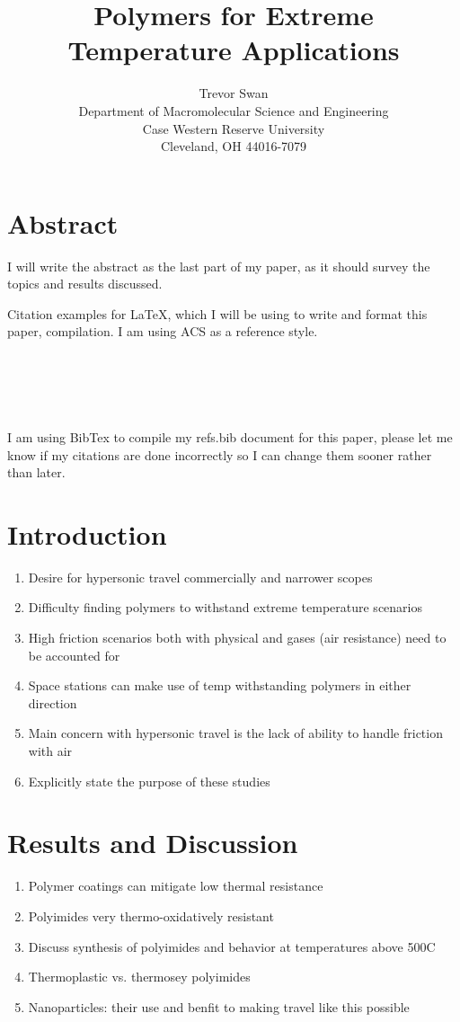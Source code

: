 \documentclass[12pt]{article}
\title{Polymers for Extreme Temperature Applications}
\author{Trevor Swan \\
Department of Macromolecular Science and Engineering \\ 
Case Western Reserve University \\
Cleveland, OH 44016-7079}
\date{}
\begin{document}
\maketitle

\section{Abstract}
	I will write the abstract as the last part of my paper, as it should survey the topics and results discussed.

\indent Citation examples for LaTeX, which I will be using to write and format this paper, compilation. I am using ACS as a reference style. \\
	\cite{Batra2020} \\
	\cite{Bashandeh2021} \\
	\cite{Dodiok2014} \\
	\cite{Rioboo2010} \\
	\cite{LiTong2022} \\
\indent I am using BibTex to compile my refs.bib document for this paper, please let me know if my citations are done incorrectly so I can change them sooner rather than later.
\section{Introduction}
	\begin{enumerate}
		\item Desire for hypersonic travel commercially and narrower scopes
		\item Difficulty finding polymers to withstand extreme temperature scenarios
		\item High friction scenarios both with physical and gases (air resistance) need to be accounted for
		\item Space stations can make use of temp withstanding polymers in either direction
		\item Main concern with hypersonic travel is the lack of ability to handle friction with air
		\item Explicitly state the purpose of these studies
	\end{enumerate}
\section{Results and Discussion}
	\begin{enumerate}
		\item Polymer coatings can mitigate low thermal resistance
		\item Polyimides very thermo-oxidatively resistant \cite{Dodiok2014}
		\item Discuss synthesis of polyimides and behavior at temperatures above 500\degree C
		\item Thermoplastic vs. thermosey polyimides 
		\item Nanoparticles: their use and benfit to making travel like this possible
	\end{enumerate}
\end{document}
